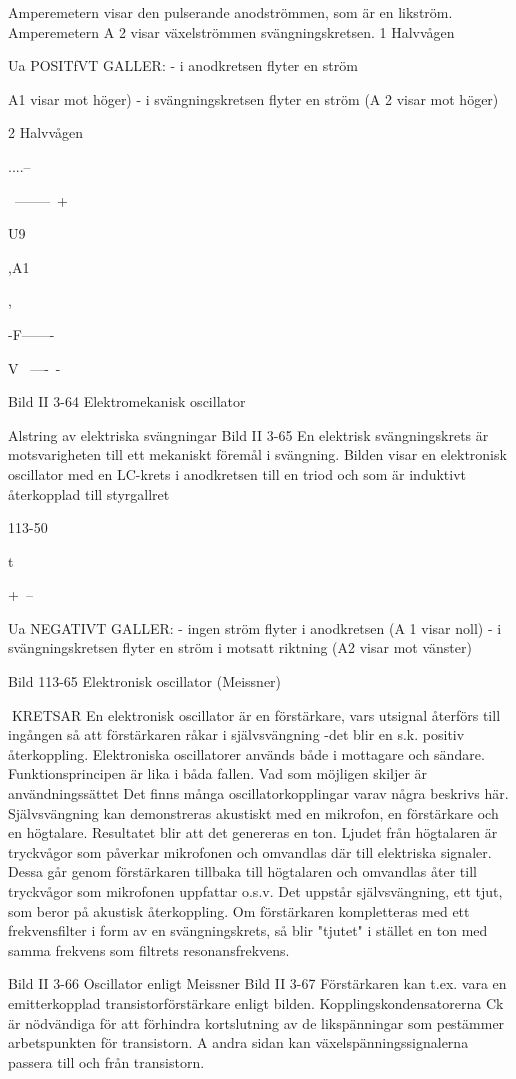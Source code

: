 Amperemetern
visar den pulserande
anodströmmen, som är en likström.
Amperemetern A 2 visar växelströmmen
svängningskretsen.
1 Halvvågen

Ua
POSITfVT GALLER:
- i anodkretsen flyter en ström
{A1 visar mot höger)
- i svängningskretsen flyter en ström
(A 2 visar mot höger)

2 Halvvågen

....--~

~--------~+

U9

,A1

,

-F-------~

V
~----~-

Bild II 3-64 Elektromekanisk oscillator

Alstring av elektriska svängningar
Bild II 3-65
En elektrisk svängningskrets är motsvarigheten till ett mekaniskt föremål i svängning.
Bilden visar en elektronisk oscillator med en
LC-krets i anodkretsen till en triod och som
är induktivt återkopplad till styrgallret

113-50

t

+~--~

Ua
NEGATIVT GALLER:
- ingen ström flyter i anodkretsen
(A 1 visar noll)
- i svängningskretsen flyter en ström
i motsatt riktning
(A2 visar mot vänster)

Bild 113-65 Elektronisk oscillator (Meissner)

KRETSAR
En elektronisk oscillator är en förstärkare, vars utsignal återförs till ingången så
att förstärkaren råkar i självsvängning -det
blir en s.k. positiv återkoppling.
Elektroniska oscillatorer används både i
mottagare och sändare. Funktionsprincipen
är lika i båda fallen. Vad som möjligen skiljer
är användningssättet Det finns många oscillatorkopplingar varav några beskrivs här.
Självsvängning kan demonstreras akustiskt med en mikrofon, en förstärkare och en
högtalare. Resultatet blir att det genereras
en ton. Ljudet från högtalaren är tryckvågor
som påverkar mikrofonen och omvandlas
där till elektriska signaler. Dessa går genom
förstärkaren tillbaka till högtalaren och omvandlas åter till tryckvågor som mikrofonen
uppfattar o.s.v. Det uppstår självsvängning,
ett tjut, som beror på akustisk återkoppling.
Om förstärkaren kompletteras med ett frekvensfilter i form av en svängningskrets, så
blir "tjutet" i stället en ton med samma frekvens som filtrets resonansfrekvens.

Bild II 3-66 Oscillator enligt Meissner
Bild II 3-67
Förstärkaren kan t.ex. vara en emitterkopplad transistorförstärkare enligt bilden.
Kopplingskondensatorerna Ck är nödvändiga för att förhindra kortslutning av de likspänningar som pestämmer arbetspunkten
för transistorn. A andra sidan kan växelspänningssignalerna passera till och från
transistorn.

}

